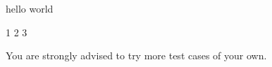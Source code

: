 \begin{console}[commandchars=\\\{\}]
hello world
\end{console}

\nextt
\begin{console}[commandchars=\\\{\}]
1 2 3
\end{console}

You are strongly advised to try more test cases of your own.
